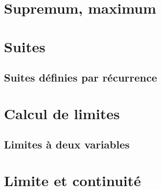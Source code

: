 
\section{Supremum, maximum}





\section{Suites}




\subsection{Suites définies par récurrence}



\section{Calcul de limites}


\subsection{Limites à deux variables}



					\section{Limite et continuité}

